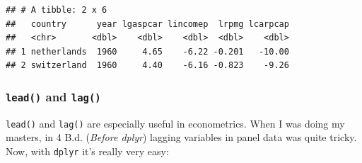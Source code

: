 \documentclass[]{gitbook}
\newenvironment{Shaded}{\begin{snugshade}}{\end{snugshade}}
\newcommand{\DataTypeTok}[1]{\textcolor[rgb]{0.13,0.29,0.53}{#1}}
\newcommand{\DecValTok}[1]{\textcolor[rgb]{0.00,0.00,0.81}{#1}}
\newcommand{\KeywordTok}[1]{\textcolor[rgb]{0.13,0.29,0.53}{\textbf{#1}}}
\newcommand{\NormalTok}[1]{#1}
\newcommand{\OperatorTok}[1]{\textcolor[rgb]{0.81,0.36,0.00}{\textbf{#1}}}
\newcommand{\StringTok}[1]{\textcolor[rgb]{0.31,0.60,0.02}{#1}}
\begin{document}
\begin{Shaded}
\end{Shaded}

\begin{verbatim}
## # A tibble: 2 x 6
##   country      year lgaspcar lincomep  lrpmg lcarpcap
##   <chr>       <dbl>    <dbl>    <dbl>  <dbl>    <dbl>
## 1 netherlands  1960     4.65    -6.22 -0.201   -10.00
## 2 switzerland  1960     4.40    -6.16 -0.823    -9.26
\end{verbatim}

\hypertarget{lead-and-lag}{%
\subsubsection{\texorpdfstring{\texttt{lead()} and \texttt{lag()}}{lead() and lag()}}\label{lead-and-lag}}

\texttt{lead()} and \texttt{lag()} are especially useful in econometrics. When I was doing my masters, in 4 B.d.
(\emph{Before dplyr}) lagging variables in panel data was quite tricky. Now, with \texttt{dplyr} it's really
very easy:

\begin{Shaded}
\end{Shaded}
\end{document}
